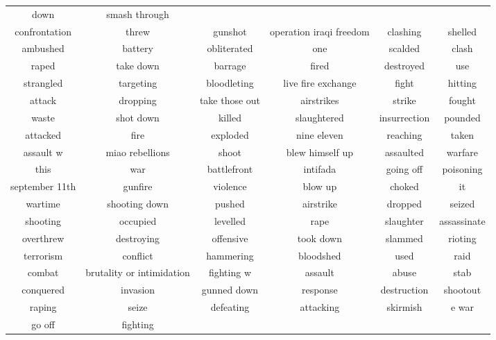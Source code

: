 \documentclass[11pt, oneside]{article}   	%
\begin{document}
\begin{itemize}
\begin{itemize}
\begin{tabular}{ c c c c c c }
down & smash through\\confrontation & threw & gunshot & operation iraqi freedom & clashing & shelled\\ambushed & battery & obliterated & one & scalded & clash\\raped & take down & barrage & fired & destroyed & use\\strangled & targeting & bloodleting & live fire
exchange & fight & hitting\\attack & dropping & take those out & airstrikes & strike & fought\\waste & shot down & killed & slaughtered & insurrection & pounded\\attacked & fire & exploded & nine eleven & reaching & taken\\assault w & miao
rebellions & shoot & blew himself up & assaulted & warfare\\this & war & battlefront & intifada & going off & poisoning\\september 11th & gunfire & violence & blow up & choked & it\\wartime & shooting down & pushed & airstrike & dropped & seized\\shooting & occupied & levelled & rape & slaughter & assassinate\\overthrew & destroying & offensive & took down & slammed & rioting\\terrorism & conflict & hammering & bloodshed & used & raid\\combat & brutality or intimidation & fighting w & assault & abuse & stab\\conquered & invasion & gunned down & response & destruction & shootout\\raping & seize & defeating & attacking & skirmish & e war\\go off & fighting
		\end{tabular}
	\end{itemize}


\end{itemize}
\end{document}

